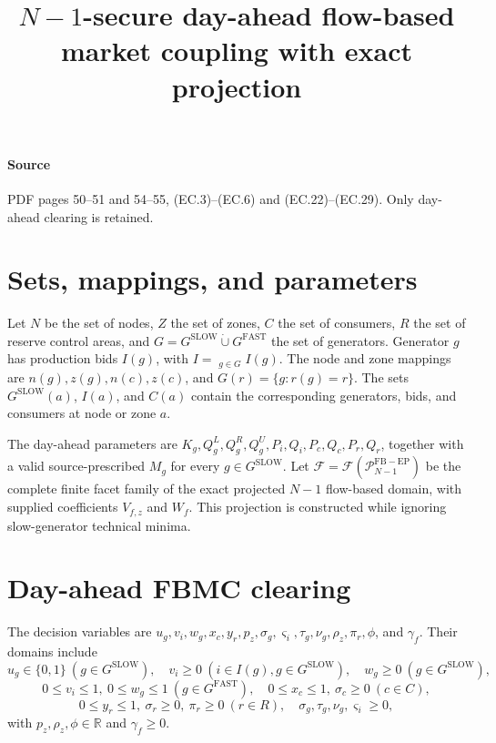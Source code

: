 \documentclass{article}
\begin{document}
\title{$N-1$-secure day-ahead flow-based market coupling with exact projection}
\date{}
\maketitle

\paragraph{Source} PDF pages 50--51 and 54--55, (EC.3)--(EC.6) and (EC.22)--(EC.29). Only day-ahead clearing is retained.
\section*{Sets, mappings, and parameters}
Let $N$ be the set of nodes, $Z$ the set of zones, $C$ the set of consumers, $R$ the set of reserve control areas, and $G=G^{\mathrm{SLOW}}\mathbin{\dot\cup}G^{\mathrm{FAST}}$ the set of generators. Generator $g$ has production bids $I(g)$, with $I=\mathop{\dot\bigcup}_{g\in G}I(g)$. The node and zone mappings are $n(g),z(g),n(c),z(c)$, and $G(r)=\{g:r(g)=r\}$. The sets $G^{\mathrm{SLOW}}(a)$, $I(a)$, and $C(a)$ contain the corresponding generators, bids, and consumers at node or zone $a$.

The day-ahead parameters are $K_g,Q_g^L,Q_g^R,Q_g^U,P_i,Q_i,P_c,Q_c,P_r,Q_r$, together with a valid source-prescribed $M_g$ for every $g\in G^{\mathrm{SLOW}}$. Let $\mathcal F=\mathcal F(\mathcal P_{N-1}^{\mathrm{FB-EP}})$ be the complete finite facet family of the exact projected $N-1$ flow-based domain, with supplied coefficients $V_{f,z}$ and $W_f$. This projection is constructed while ignoring slow-generator technical minima.

\section*{Day-ahead FBMC clearing}
The decision variables are $u_g,v_i,w_g,x_c,y_r,p_z,\sigma_g,\varsigma_i,\tau_g,\nu_g,\rho_z,\pi_r,\phi$, and $\gamma_f$. Their domains include
\[
 u_g\in\{0,1\}\ (g\in G^{\mathrm{SLOW}}),\quad v_i\geq0\ (i\in I(g),g\in G^{\mathrm{SLOW}}),\quad w_g\geq0\ (g\in G^{\mathrm{SLOW}}),
\]
\[
0\leq v_i\leq1,\ 0\leq w_g\leq1\ (g\in G^{\mathrm{FAST}}),\quad0\leq x_c\leq1,\ \sigma_c\geq0\ (c\in C),
\]
\[
0\leq y_r\leq1,\ \sigma_r\geq0,\ \pi_r\geq0\ (r\in R),\quad \sigma_g,\tau_g,\nu_g,\varsigma_i\geq0,
\]
with $p_z,\rho_z,\phi\in\mathbb R$ and $\gamma_f\geq0$.
\end{document}
